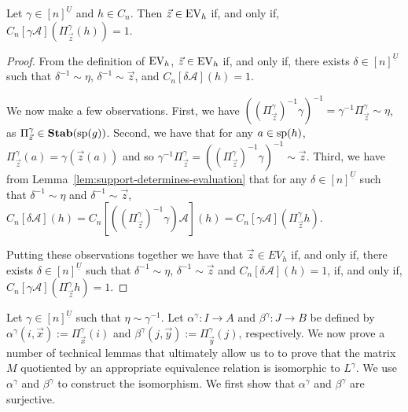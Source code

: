 \documentclass[../main/thesis.tex]{subfiles}
\begin{document}
\begin{lem}
	Let $\gamma\in [n]^{\underline{U}}$ and $h \in C_n$. Then $\vec{z} \in \text{EV}_h$
  if, and only if, $C_n[\gamma \mathcal{A}](\Pi^{\gamma}_{\vec{z}} (h)) = 1$.
  \label{lem:translate-EV-circuits}
\end{lem}
\begin{proof}
  From the definition of $\text{EV}_h$, $\vec{z} \in \text{EV}_h$ if, and only if, there
  exists $\delta \in [n]^{\underline{U}}$ such that $\delta^{-1} \sim \eta$,
  $\delta^{-1} \sim \vec{z}$, and $C_n[\delta \mathcal{A}](h) = 1$.

  We now make a few observations. First, we have $((\Pi^{\gamma}_{\vec{z}})^{-1}
  \gamma)^{-1} = \gamma^{-1}\Pi^{\gamma}_{\vec{z}} \sim \eta$, as
  $\Pi^{\gamma}_{\vec{z}} \in \text{\textbf{Stab}} (\text{sp} (g))$. Second, we have that for any $a \in
  \text{sp}(h)$, $\Pi^{\gamma}_{\vec{z}}(a) = \gamma (\vec{z}(a))$ and so
  $\gamma^{-1}\Pi^{\gamma}_{\vec{z}} = ((\Pi^{\gamma}_{\vec{z}})^{-1}
  \gamma)^{-1} \sim \vec{z}$. Third, we have from
  Lemma~\ref{lem:support-determines-evaluation} that for any $\delta \in
  [n]^{\underline{U}}$ such that $\delta^{-1} \sim \eta$ and $\delta^{-1} \sim
  \vec{z}$, $C_n[\delta \mathcal{A}](h) =
  C_n[((\Pi^{\gamma}_{\vec{z}})^{-1}\gamma) \mathcal{A}](h) = C_n[\gamma
  \mathcal{A}](\Pi^{\gamma}_{\vec{z}}h)$.

  Putting these observations together we have that $\vec{z} \in EV_h$ if, and
  only if, there exists $\delta \in [n]^{\underline{U}}$ such that $\delta^{-1}
  \sim \eta$, $\delta^{-1} \sim \vec{z}$ and $C_n[\delta \mathcal{A}](h) = 1$,
  if, and only if, $C_n[\gamma \mathcal{A}](\Pi^{\gamma}_{\vec{z}}h) = 1$.
\end{proof}

Let $\gamma \in [n]^{\underline{U}}$ such that $\eta \sim \gamma^{-1}$. Let
$\alpha^{\gamma}: I \rightarrow A$ and $\beta^{\gamma}: J \rightarrow B$ be
defined by $\alpha^{\gamma} (i, \vec{x}) := \Pi^{\gamma}_{\vec{x}}(i)$ and
$\beta^{\gamma} (j, \vec{y}) := \Pi^{\gamma}_{\vec{y}}(j)$, respectively. We now
prove a number of technical lemmas that ultimately allow us to to prove that the
matrix $M$ quotiented by an appropriate equivalence relation is isomorphic to
$L^{\gamma}$. We use $\alpha^{\gamma}$ and $\beta^{\gamma}$ to construct the
isomorphism. We first show that $\alpha^{\gamma}$ and $\beta^{\gamma}$ are
surjective.
\end{document}
